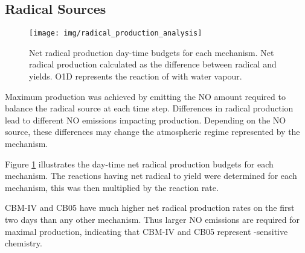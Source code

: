%

\subsection{Radical Sources} \label{ss:radicals}

\begin{figure}
    \centering
    \texttt{[image: img/radical\_production\_analysis]}
    \vspace{0mm}
    \caption{Net radical production day-time budgets for each mechanism. Net radical production calculated as the difference between radical and  yields. O1D represents the reaction of  with water vapour.}
    \vspace{-4mm}
    \label{f:radical_production} 
\end{figure} 

Maximum  production was achieved by emitting the NO amount required to balance the radical source at each time step. 
Differences in radical production lead to different NO emissions impacting  production.
Depending on the NO source, these differences may change the atmospheric regime represented by the mechanism.

Figure \ref{f:radical_production} illustrates the day-time net radical production budgets for each mechanism.
The reactions having net radical to  yield were determined for each mechanism, this was then multiplied by the reaction rate.

CBM-IV and CB05 have much higher net radical production rates on the first two days than any other mechanism.
Thus larger NO emissions are required for maximal  production, indicating that CBM-IV and CB05 represent -sensitive chemistry.

